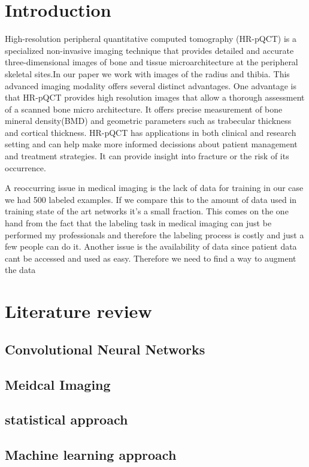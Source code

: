 \documentclass[acmsmall, review]{acmart}
\begin{document}
\section{Introduction}
	
	High-resolution peripheral quantitative computed tomography (HR-pQCT) is a specialized non-invasive imaging technique that provides detailed and accurate three-dimensional images of bone and tissue microarchitecture at the peripheral skeletal sites.In our paper we work with images of the radius and thibia. This advanced imaging modality offers several distinct advantages. One advantage is that HR-pQCT provides high resolution images that allow a thorough assessment of a scanned bone micro architecture. It offers precise measurement of bone mineral density(BMD) and geometric parameters such as trabecular thickness and cortical thickness. HR-pQCT has applications in both clinical and research setting and can help make more informed decissions about patient management and treatment strategies. It can provide insight into fracture or the risk of its occurrence.
	
	A reoccurring issue in medical imaging is the lack of data for training in our case we had 500 labeled examples. If we compare this to the amount of data used in training state of the art networks it's a small fraction. This comes on the one hand from the fact that the labeling task in medical imaging can just be performed my professionals and therefore the labeling process is costly and just a few people can do it. Another issue is the availability of data since patient data cant be accessed and used as easy. Therefore we need to find a way to augment the data 
\section{Literature review}
\subsection{Convolutional Neural Networks}
\subsection{Meidcal Imaging }
\subsection{statistical approach}
\subsection{Machine learning approach}
\end{document}
